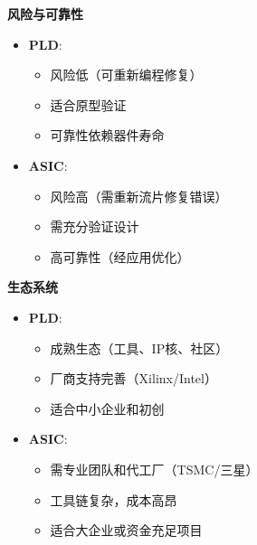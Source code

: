 \documentclass[
  ignorenonframetext,
  chinese,
]{beamer}
\providecommand{\tightlist}{%
  \setlength{\itemsep}{0pt}\setlength{\parskip}{0pt}}
\begin{document}
\begin{frame}
\textbf{风险与可靠性}

\begin{itemize}
\tightlist
\item
  \textbf{PLD}:

  \begin{itemize}
  \tightlist
  \item
    风险低（可重新编程修复）\\
  \item
    适合原型验证\\
  \item
    可靠性依赖器件寿命\\
  \end{itemize}
\item
  \textbf{ASIC}:

  \begin{itemize}
  \tightlist
  \item
    风险高（需重新流片修复错误）\\
  \item
    需充分验证设计\\
  \item
    高可靠性（经应用优化）
  \end{itemize}
\end{itemize}
\end{frame}

\begin{frame}
\textbf{生态系统}

\begin{itemize}
\tightlist
\item
  \textbf{PLD}:

  \begin{itemize}
  \tightlist
  \item
    成熟生态（工具、IP核、社区）\\
  \item
    厂商支持完善（Xilinx/Intel）\\
  \item
    适合中小企业和初创\\
  \end{itemize}
\item
  \textbf{ASIC}:

  \begin{itemize}
  \tightlist
  \item
    需专业团队和代工厂（TSMC/三星）\\
  \item
    工具链复杂，成本高昂\\
  \item
    适合大企业或资金充足项目
  \end{itemize}
\end{itemize}
\end{frame}
\end{document}
